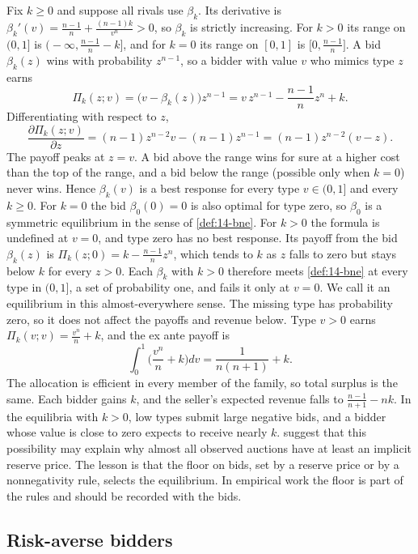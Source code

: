 Fix $k\ge 0$ and suppose all rivals use $\beta_k$. Its derivative is $\beta_k'(v)=\frac{n-1}{n}+\frac{(n-1)k}{v^n}>0$, so $\beta_k$ is strictly increasing. For $k>0$ its range on $(0,1]$ is $\big(-\infty,\frac{n-1}{n}-k\big]$, and for $k=0$ its range on $[0,1]$ is $\big[0,\frac{n-1}{n}\big]$. A bid $\beta_k(z)$ wins with probability $z^{n-1}$, so a bidder with value $v$ who mimics type $z$ earns
\[
\Pi_k(z;v)=\big(v-\beta_k(z)\big)z^{n-1}=v\,z^{n-1}-\frac{n-1}{n}z^n+k.
\]
Differentiating with respect to $z$,
\[
\frac{\partial\Pi_k(z;v)}{\partial z}=(n-1)z^{n-2}v-(n-1)z^{n-1}=(n-1)z^{n-2}(v-z).
\]
The payoff peaks at $z=v$. A bid above the range wins for sure at a higher cost than the top of the range, and a bid below the range (possible only when $k=0$) never wins. Hence $\beta_k(v)$ is a best response for every type $v\in(0,1]$ and every $k\ge 0$. For $k=0$ the bid $\beta_0(0)=0$ is also optimal for type zero, so $\beta_0$ is a symmetric equilibrium in the sense of \cref{def:14-bne}. For $k>0$ the formula is undefined at $v=0$, and type zero has no best response. Its payoff from the bid $\beta_k(z)$ is $\Pi_k(z;0)=k-\frac{n-1}{n}z^n$, which tends to $k$ as $z$ falls to zero but stays below $k$ for every $z>0$. Each $\beta_k$ with $k>0$ therefore meets \cref{def:14-bne} at every type in $(0,1]$, a set of probability one, and fails it only at $v=0$. We call it an equilibrium in this almost-everywhere sense. The missing type has probability zero, so it does not affect the payoffs and revenue below. Type $v>0$ earns $\Pi_k(v;v)=\frac{v^n}{n}+k$, and the ex ante payoff is
\[
\int_0^1\Big(\frac{v^n}{n}+k\Big)dv=\frac{1}{n(n+1)}+k.
\]
The allocation is efficient in every member of the family, so total surplus is the same. Each bidder gains $k$, and the seller's expected revenue falls to $\frac{n-1}{n+1}-nk$. In the equilibria with $k>0$, low types submit large negative bids, and a bidder whose value is close to zero expects to receive nearly $k$.  suggest that this possibility may explain why almost all observed auctions have at least an implicit reserve price. The lesson is that the floor on bids, set by a reserve price or by a nonnegativity rule, selects the equilibrium. In empirical work the floor is part of the rules and should be recorded with the bids.

\subsection{Risk-averse bidders}\label{sec:14-fpa-risk}

